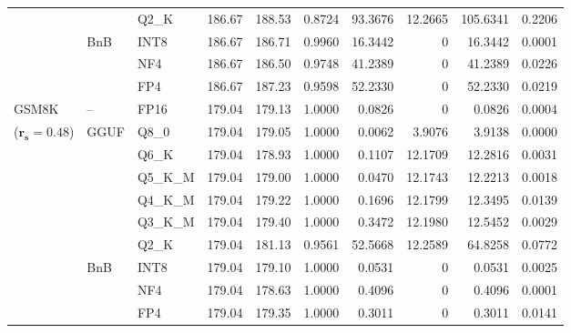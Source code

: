 \begin{longtable}{ll l rrrrrrr}
 &  & Q2\_K & 186.67 & 188.53 & \cellcolor{red!18} 0.8724 & \cellcolor{red!18} 93.3676 & 12.2665 & \cellcolor{red!18} 105.6341 & \cellcolor{red!18} 0.2206 \\
 & BnB & INT8 & 186.67 & 186.71 & 0.9960 & 16.3442 & \cellcolor{cyan!12} $0$ & 16.3442 & 0.0001 \\
 &  & NF4 & 186.67 & 186.50 & 0.9748 & 41.2389 & \cellcolor{cyan!12} $0$ & 41.2389 & 0.0226 \\
 &  & FP4 & 186.67 & 187.23 & 0.9598 & 52.2330 & \cellcolor{cyan!12} $0$ & 52.2330 & 0.0219 \\
\midrule
GSM8K & -- & FP16 & 179.04 & 179.13 & 1.0000 & 0.0826 & \cellcolor{cyan!12} $0$ & 0.0826 & 0.0004 \\
{\small ($\mathbf{r_s{=}0.48}$)} & GGUF & Q8\_0 & 179.04 & 179.05 & 1.0000 & 0.0062 & 3.9076 & 3.9138 & 0.0000 \\
 &  & Q6\_K & 179.04 & 178.93 & 1.0000 & 0.1107 & 12.1709 & 12.2816 & 0.0031 \\
 &  & Q5\_K\_M & 179.04 & 179.00 & 1.0000 & 0.0470 & 12.1743 & 12.2213 & 0.0018 \\
 &  & Q4\_K\_M & 179.04 & 179.22 & 1.0000 & 0.1696 & 12.1799 & 12.3495 & 0.0139 \\
 &  & Q3\_K\_M & 179.04 & 179.40 & 1.0000 & 0.3472 & 12.1980 & 12.5452 & 0.0029 \\
 &  & Q2\_K & 179.04 & 181.13 & 0.9561 & 52.5668 & 12.2589 & 64.8258 & 0.0772 \\
 & BnB & INT8 & 179.04 & 179.10 & 1.0000 & 0.0531 & \cellcolor{cyan!12} $0$ & 0.0531 & 0.0025 \\
 &  & NF4 & 179.04 & 178.63 & 1.0000 & 0.4096 & \cellcolor{cyan!12} $0$ & 0.4096 & 0.0001 \\
 &  & FP4 & 179.04 & 179.35 & 1.0000 & 0.3011 & \cellcolor{cyan!12} $0$ & 0.3011 & 0.0141 \\
\end{longtable}
\endgroup